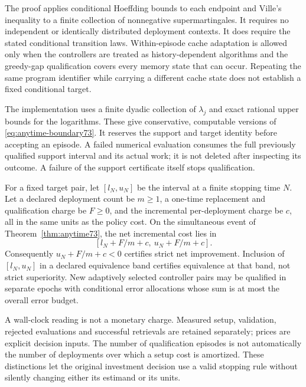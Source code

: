 The proof applies conditional Hoeffding bounds to each endpoint and Ville's inequality to a finite collection of nonnegative supermartingales. It requires no independent or identically distributed deployment contexts. It does require the stated conditional transition laws. Within-episode cache adaptation is allowed only when the controllers are treated as history-dependent algorithms and the greedy-gap qualification covers every memory state that can occur. Repeating the same program identifier while carrying a different cache state does not establish a fixed conditional target.

The implementation uses a finite dyadic collection of $\lambda_j$ and exact rational upper bounds for the logarithms. These give conservative, computable versions of \eqref{eq:anytime-boundary73}. It reserves the support and target identity before accepting an episode. A failed numerical evaluation consumes the full previously qualified support interval and its actual work; it is not deleted after inspecting its outcome. A failure of the support certificate itself stops qualification.

\begin{corollary}\label{cor:adoption73}
For a fixed target pair, let $[l_N,u_N]$ be the interval at a finite stopping time $N$. Let a declared deployment count be $m\ge1$, a one-time replacement and qualification charge be $F\ge0$, and the incremental per-deployment charge be $c$, all in the same units as the policy cost. On the simultaneous event of Theorem~\ref{thm:anytime73}, the net incremental cost lies in
\[
 [l_N+F/m+c,\ u_N+F/m+c].
\]
Consequently $u_N+F/m+c<0$ certifies strict net improvement. Inclusion of $[l_N,u_N]$ in a declared equivalence band certifies equivalence at that band, not strict superiority. New adaptively selected controller pairs may be qualified in separate epochs with conditional error allocations whose sum is at most the overall error budget.
\end{corollary}

A wall-clock reading is not a monetary charge. Measured setup, validation, rejected evaluations and successful retrievals are retained separately; prices are explicit decision inputs. The number of qualification episodes is not automatically the number of deployments over which a setup cost is amortized. These distinctions let the original investment decision use a valid stopping rule without silently changing either its estimand or its units.
